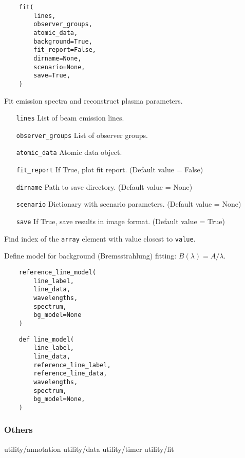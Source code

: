 \documentclass[../../main.tex]{subfiles}
\begin{document}
\begin{verbatim}
    fit(
        lines,
        observer_groups,
        atomic_data,
        background=True,
        fit_report=False,
        dirname=None,
        scenario=None,
        save=True,
    )
\end{verbatim}

Fit emission spectra and reconstruct plasma parameters.

\begin{itemize}[align=left]
    \item[\texttt{lines}] List of beam emission lines.
    \item[\texttt{observer\_groups}] List of observer groups.
    \item[\texttt{atomic\_data}] Atomic data object.
    \item[\texttt{fit\_report}] If True, plot fit report. (Default value = False)
    \item[\texttt{dirname}] Path to save directory. (Default value = None)
    \item[\texttt{scenario}] Dictionary with scenario parameters. (Default value = None)
    \item[\texttt{save}] If True, save results in image format. (Default value = True)
\end{itemize}

Find index of the \texttt{array} element with value closest to \texttt{value}.

Define model for background (Bremsstrahlung) fitting: $B(\lambda) = A / \lambda$.

\begin{verbatim}
    reference_line_model(
        line_label,
        line_data,
        wavelengths,
        spectrum,
        bg_model=None
    )
\end{verbatim}

\begin{verbatim}
    def line_model(
        line_label,
        line_data,
        reference_line_label,
        reference_line_data,
        wavelengths,
        spectrum,
        bg_model=None,
    )
\end{verbatim}

\subsubsection{Others}%
\label{sec:other}

utility/annotation
utility/data
utility/timer
utility/fit
\end{document}
